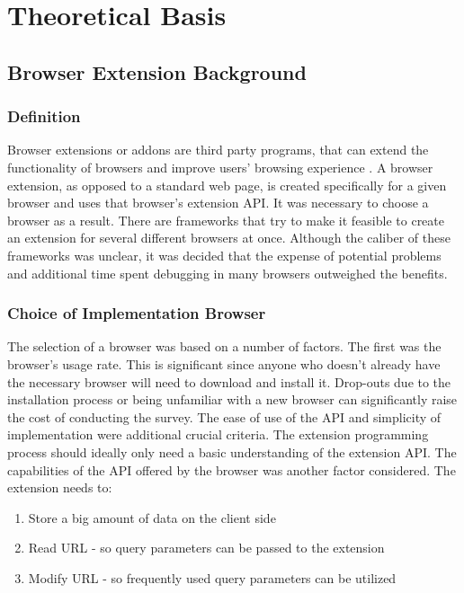 \newpage
\chapter{Theoretical Basis}

\section{Browser Extension Background}

\subsection{Definition}

Browser extensions or addons are third party programs, that can extend the functionality of browsers and improve users' browsing experience \autocite{some2019empoweb}. A browser extension, as opposed to a standard web page, is created specifically for a given browser and uses that browser's extension API. It was necessary to choose a browser as a result. There are frameworks that try to make it feasible to create an extension for several different browsers at once. Although the caliber of these frameworks was unclear, it was decided that the expense of potential problems and additional time spent debugging in many browsers outweighed the benefits.

\subsection{Choice of Implementation Browser}

The selection of a browser was based on a number of factors. The first was the browser's usage rate. This is significant since anyone who doesn't already have the necessary browser will need to download and install it. Drop-outs due to the installation process or being unfamiliar with a new browser can significantly raise the cost of conducting the survey. The ease of use of the API and simplicity of implementation were additional crucial criteria. The extension programming process should ideally only need a basic understanding of the extension API. The capabilities of the API offered by the browser was another factor considered. The extension needs to:

\begin{enumerate}
  \item Store a big amount of data on the client side
  \item Read URL - so query parameters can be passed to the extension
  \item Modify URL - so frequently used query parameters can be utilized
\end{enumerate}

